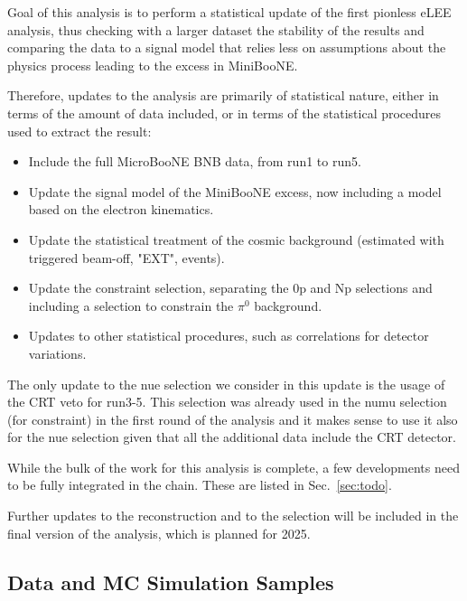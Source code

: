 Goal of this analysis is to perform a statistical update of the first pionless eLEE analysis, thus checking with a larger dataset the stability of the results and comparing the data to a signal model that relies less on assumptions about the physics process leading to the excess in MiniBooNE.

Therefore, updates to the analysis are primarily of statistical nature, either in terms of the amount of data included, or in terms of the statistical procedures used to extract the result:
\begin{itemize}
    \item Include the full MicroBooNE BNB data, from run1 to run5.
    \item Update the signal model of the MiniBooNE excess, now including a model based on the electron kinematics.
    \item Update the statistical treatment of the cosmic background (estimated with triggered beam-off, "EXT", events).
    \item Update the constraint selection, separating the 0p and Np selections and including a selection to constrain the $\pi^0$ background.
    \item Updates to other statistical procedures, such as correlations for detector variations.
\end{itemize}
The only update to the nue selection we consider in this update is the usage of the CRT veto for run3-5. This selection was already used in the numu selection (for constraint) in the first round of the analysis and it makes sense to use it also for the nue selection given that all the additional data include the CRT detector.

While the bulk of the work for this analysis is complete, a few developments need to be fully integrated in the chain. These are listed in Sec.~\ref{sec:todo}.

Further updates to the reconstruction and to the selection will be included in the final version of the analysis, which is planned for 2025.

\subsection{Data and MC Simulation Samples}

